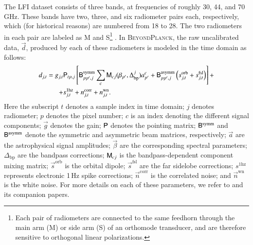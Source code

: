 \documentclass{aa}
\renewcommand{\d}[0]{\vec{d}}
\newcommand{\n}[0]{\vec{n}}
\newcommand{\s}[0]{\vec{s}}
\renewcommand{\a}[0]{\vec{a}}
\newcommand{\B}[0]{\tens{B}}
\newcommand{\g}[0]{\vec{g}}
\newcommand{\M}[0]{\tens{M}}
\renewcommand{\P}[0]{\tens{P}}
\newcommand{\BP}{\textsc{BeyondPlanck}}
\begin{document}
The LFI dataset consists of three bands, at frequencies of
roughly 30, 44, and 70\,GHz. These bands have two, three, and six radiometer
pairs each, respectively, which (for historical reasons) are numbered
from 18 to 28. The two radiometers in each pair are labeled as M and S\footnote{Each pair of radiometers are connected to the same feedhorn through the main arm (M) or side arm (S) of an orthomode transducer, and are therefore sensitive to orthogonal linear polarizations.}
\citep{planck2013-p02}. In \BP, the raw uncalibrated data, $\d$, produced by
each of these radiometers is modeled in the time domain as follows:\begin{equation}
        \begin{split}
                d_{j,t} = g_{j,t}&\P_{tp,j}\left[\B^{\mathrm{symm}}_{pp',j}\sum_{c}
                \M_{cj}(\beta_{p'}, \Delta_\mathrm{bp}^{j})a^c_{p'}  + \B^{\mathrm{asymm}}_{pp',j}\left(s^{\mathrm{orb}}_{j,t}  
                + s^{\mathrm{fsl}}_{j,t}\right)\right] + \\
                + &s^{\mathrm{1hz}}_{j,t} + n^{\mathrm{corr}}_{j,t} + n^{\mathrm{wn}}_{j,t}.
        \end{split}
        \label{eq:todmodel}
\end{equation}
Here the subscript $t$ denotes a sample index in time domain; $j$ denotes
radiometer; $p$ denotes the pixel number; $c$ is an index denoting the different 
signal components; $\g$
denotes the gain; $\P$ denotes the pointing matrix; $\B^{\mathrm{symm}}$ and
$\B^{\mathrm{asymm}}$ denote the symmetric and asymmetric beam matrices,
respectively; $\a$ are the astrophysical signal amplitudes; $\vec{\beta}$ are
the corresponding spectral parameters; $\Delta_\mathrm{bp}$ are the bandpass
corrections; $\M_{cj}$ is the bandpass-dependent component mixing matrix;
$\s^{\mathrm{orb}}$ is the orbital dipole; $\s^{\mathrm{fsl}}$ are the far
sidelobe corrections; $s^{\mathrm{1hz}}$ represents electronic 1\,Hz spike corrections; $\n^{\mathrm{corr}}$ is the correlated noise; and
$\n^{\mathrm{wn}}$ is the white noise. For more details on each of these
parameters, we refer to \citet{bp01} and its companion papers. 
\end{document}
